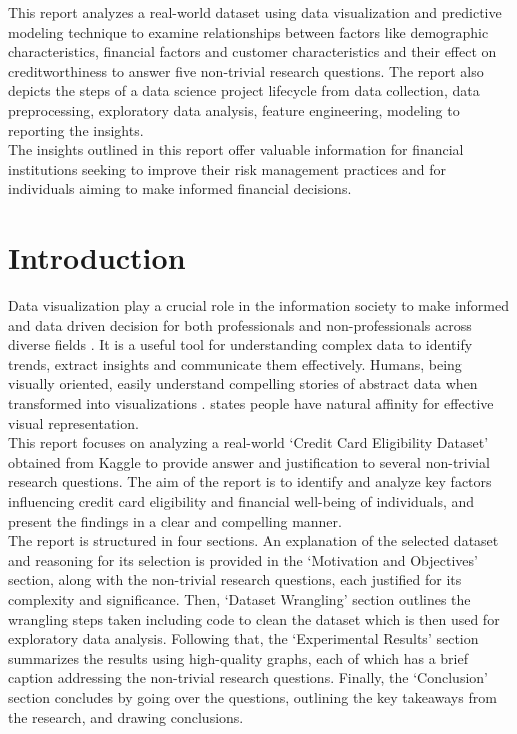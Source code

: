 \documentclass{article}\usepackage[]{graphicx}\usepackage[]{xcolor}
\begin{document}
This report analyzes a real-world dataset using data visualization and predictive modeling technique to examine relationships between factors like demographic characteristics, financial factors and customer characteristics and their effect on creditworthiness to answer five non-trivial research questions. The report also depicts the steps of a data science project lifecycle from data collection, data preprocessing, exploratory data analysis, feature engineering, modeling to reporting the insights.\\

The insights outlined in this report offer valuable information for financial institutions seeking to improve their risk management practices and for individuals aiming to make informed financial decisions.
\newpage


\section{Introduction}

Data visualization play a crucial role in the information society to make informed and data driven decision for both professionals and non-professionals across diverse fields \citep{inastrilla2023data}. It is a useful tool for understanding complex data to identify trends, extract insights and communicate them effectively. Humans, being visually oriented, easily understand compelling stories of abstract data when transformed into visualizations \citep{qin2020making}. \cite{shakeel2022comprehensive} states people have natural affinity for effective visual representation. \\

This report focuses on analyzing a real-world `Credit Card Eligibility Dataset' obtained from Kaggle to provide answer and justification to several non-trivial research questions. The aim of the report is to identify and analyze key factors influencing credit card eligibility and financial well-being of individuals, and present the findings in a clear and compelling manner. \\

The report is structured in four sections. An explanation of the selected dataset and reasoning for its selection is provided in the `Motivation and Objectives' section, along with the non-trivial research questions, each justified for its complexity and significance. Then, `Dataset Wrangling' section outlines the wrangling steps taken including code to clean the dataset which is then used for exploratory data analysis. Following that, the `Experimental Results' section summarizes the results using high-quality graphs, each of which has a brief caption addressing the non-trivial research questions. Finally, the `Conclusion' section concludes by going over the questions, outlining the key takeaways from the research, and drawing conclusions. 
\newpage
\end{document}
